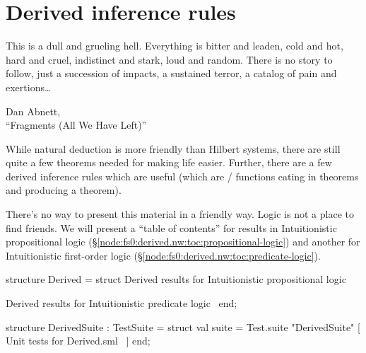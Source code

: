 
\section{Derived inference rules}

\epigraph{This is a dull and grueling hell. Everything is bitter and
  leaden, cold and hot, hard and cruel, indistinct and stark, loud and
  random. There is no story to follow, just a succession of impacts, a
  sustained terror, a catalog of pain and exertions\dots}{Dan Abnett,\\
  ``Fragments (All We Have Left)''}%

\begin{node}
While natural deduction is more friendly than Hilbert systems, there
are still quite a few theorems needed for making life easier. Further,
there are a few derived inference rules which are useful (which are
\SML/ functions eating in theorems and producing a theorem).

There's no way to present this material in a friendly way. Logic is
not a place to find friends. We will present a ``table of contents''
for results in Intuitionistic propositional logic (\S\ref{node:fs0:derived.nw:toc:propositional-logic})
and another for Intuitionistic first-order logic (\S\ref{node:fs0:derived.nw:toc:predicate-logic}).
\end{node}

\nwenddocs{}\endmoddef\nwstartdeflinemarkup\nwenddeflinemarkup
structure Derived = struct
\LA{}Derived results for Intuitionistic propositional logic~{\nwtagstyle{}}\RA{}

\LA{}Derived results for Intuitionistic predicate logic~{\nwtagstyle{}}\RA{}
end;
\nwendcode{}\nwdocspar

\nwenddocs{}\endmoddef\nwstartdeflinemarkup\nwenddeflinemarkup
structure DerivedSuite : TestSuite = struct
val suite = Test.suite "DerivedSuite" [
\LA{}Unit tests for \code{}Derived.sml\edoc{}~{\nwtagstyle{}}\RA{}
]
end;
\nwendcode{}\nwdocspar

